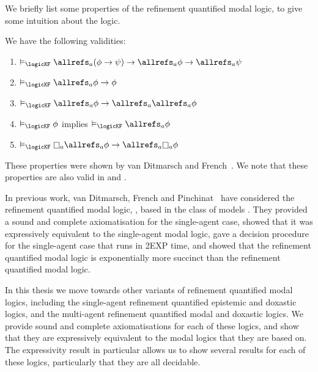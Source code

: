 We briefly list some properties of the refinement quantified modal logic, to
give some intuition about the logic. 

\begin{proposition}
We have the following validities: 
\begin{enumerate}
\item $\entails_{\logicKF} \allrefs_a (\phi \implies \psi) \implies \allrefs_a
\phi \implies \allrefs_a \psi$
\item $\entails_{\logicKF} \allrefs_a \phi \implies \phi$
\item $\entails_{\logicKF} \allrefs_a \phi \implies \allrefs_a \allrefs_a \phi$
\item $\entails_{\logicKF} \phi$ implies $\entails_{\logicKF} \allrefs_a \phi$
\item $\entails_{\logicKF} \knows_a \allrefs_a \phi \implies \allrefs_a \knows_a
\phi$
\end{enumerate}
\end{proposition}

These properties were shown by van Ditmarsch and
French~\cite{french2009simulation}. We note that these properties are also valid
in \logicSF{} and \logicKDF{}.

In previous work, van Ditmarsch, French and Pinchinat~\cite{french2010future}
have considered the refinement quantified modal logic, \logicKF{}, based in the
class of models \classK{}. They provided a sound and complete axiomatisation for
the single-agent case, showed that it was expressively equivalent to the
single-agent modal logic, gave a decision procedure for the single-agent case
that runs in 2EXP time, and showed that the refinement quantified modal logic is
exponentially more succinct than the refinement quantified modal logic.

In this thesis we move towards other variants of refinement quantified modal
logics, including the single-agent refinement quantified epistemic and doxastic
logics, and the multi-agent refinement quantified modal and doxastic logics. We
provide sound and complete axiomatisations for each of these logics, and show
that they are expressively equivalent to the modal logics that they are based
on. The expressivity result in particular allows us to show several results for
each of these logics, particularly that they are all decidable.

